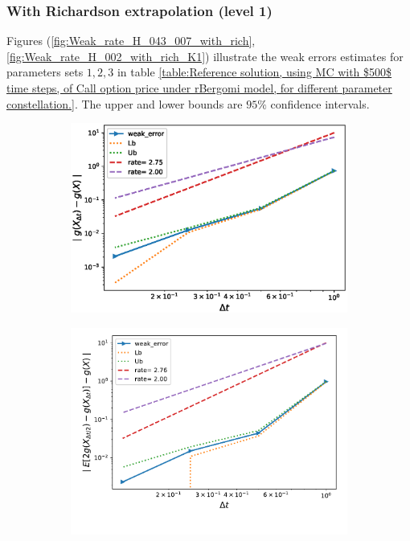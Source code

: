 \subsubsection{With Richardson extrapolation (level 1)}
Figures (\ref{fig:Weak_rate_H_043_007_with_rich}, \ref{fig:Weak_rate_H_002_with_rich_K1}) illustrate the weak errors estimates for parameters sets $1,2,3$ in table \ref{table:Reference solution, using MC with $500$ time steps, of Call option price under rBergomi model, for different parameter constellation.}. The upper and lower bounds are $95\%$ confidence intervals.
\begin{figure}[h!]
	\centering
	\begin{subfigure}{.4\textwidth}
		\centering
		\includegraphics[width=1\linewidth]{./figures/rBergomi_weak_error_rates/with_richardson/H_043/weak_convergence_order_Bergomi_H_043_K_1_M_10_6_richardson_relative}
		\caption{}
		\label{fig:sub3}
	\end{subfigure}%
	\begin{subfigure}{.4\textwidth}
		\centering
		\includegraphics[width=1\linewidth]{./figures/rBergomi_weak_error_rates/with_richardson/H_007/weak_convergence_order_Bergomi_H_007_K_1_richardson_relative_M_10_6}
		\caption{}
		\label{fig:sub4}
	\end{subfigure}
	

\end{figure}
